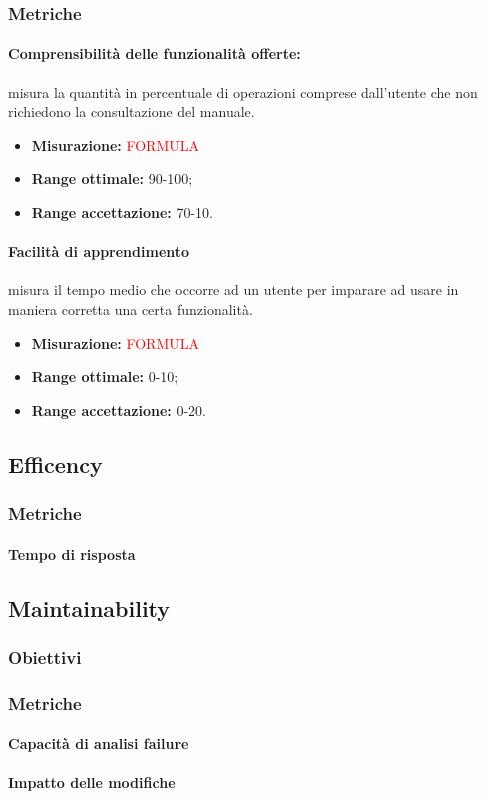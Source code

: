		\subsubsection{Metriche}
			\paragraph{Comprensibilità delle funzionalità offerte:} misura la quantità in percentuale di operazioni comprese dall'utente che non richiedono la consultazione del manuale.
			\begin{itemize}
				\item {\textbf{Misurazione:} \textcolor{red}{FORMULA}}
				\item {\textbf{Range ottimale:} 90-100;}
				\item {\textbf{Range accettazione:} 70-10.}
			\end{itemize} 
			\paragraph{Facilità di apprendimento} misura il tempo medio che occorre ad un utente per imparare ad usare in maniera corretta una certa funzionalità.
			\begin{itemize}
				\item {\textbf{Misurazione:} \textcolor{red}{FORMULA}}
				\item {\textbf{Range ottimale:} 0-10;}
				\item {\textbf{Range accettazione:} 0-20.}
			\end{itemize} 
			
	\subsection{Efficency}
		\subsubsection{Metriche}
			\paragraph{Tempo di risposta}
			
	\subsection{Maintainability}
		\subsubsection{Obiettivi}
		\subsubsection{Metriche}
			\paragraph{Capacità di analisi failure}
			\paragraph{Impatto delle modifiche}
